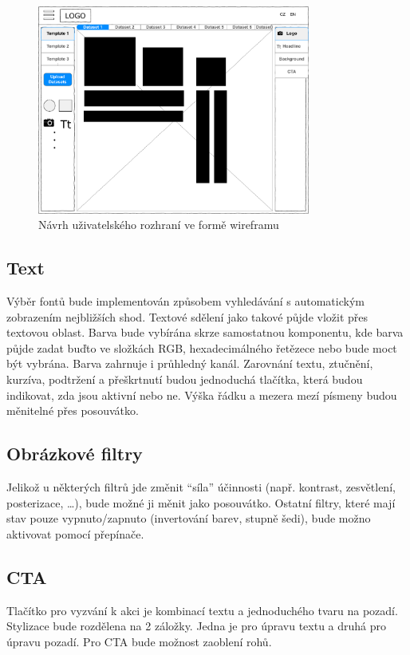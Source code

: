     \begin{figure}[ht]
        \centering
        \includegraphics[width=0.8\textwidth]{Figures/wireframe.pdf}
        \caption[Wireframe UI]{Návrh uživatelského rozhraní ve formě wireframu}
        \label{fig:ui-wireframe}
    \end{figure}

        \subsection{Text}
        Výběr fontů bude implementován způsobem vyhledávání s automatickým zobrazením nejbližších shod.
        Textové sdělení jako takové půjde vložit přes textovou oblast. Barva bude vybírána skrze samostatnou komponentu, kde barva půjde zadat buďto
        ve složkách RGB, hexadecimálného řetězece nebo bude moct být vybrána. Barva zahrnuje i průhledný kanál.
        Zarovnání textu, ztučnění, kurzíva, podtržení a přeškrtnutí budou jednoduchá tlačítka, která budou indikovat, zda jsou aktivní nebo ne.
        Výška řádku a mezera mezí písmeny budou měnitelné přes posouvátko.

        \subsection{Obrázkové filtry}
        Jelikož u některých filtrů jde změnit \enquote{síla} účinnosti (např. kontrast, zesvětlení, posterizace, \ldots), bude možné ji měnit jako posouvátko.
        Ostatní filtry, které mají stav pouze vypnuto/zapnuto (invertování barev, stupně šedi), bude možno aktivovat pomocí přepínače.

        \subsection{CTA}
        Tlačítko pro vyzvání k akci je kombinací textu a jednoduchého tvaru na pozadí. Stylizace bude rozdělena na 2 záložky. Jedna je pro úpravu textu a
        druhá pro úpravu pozadí. Pro CTA bude možnost zaoblení rohů.

